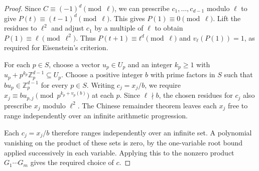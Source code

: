 \documentclass{article}
\theoremstyle{remark}
\begin{document}
\begin{proof}
    Since $C \equiv (-1)^d \pmod{\ell}$, we can prescribe $c_1, \ldots, c_{d - 1}$ modulo $\ell$ to give $P(t) \equiv (t - 1)^d \pmod{\ell}$.
    This gives $P(1) \equiv 0 \pmod{\ell}$.
    Lift the residues to $\ell^2$ and adjust $c_1$ by a multiple of $\ell$ to obtain $P(1) \equiv \ell \pmod{\ell^2}$.
    Thus $P(t + 1) \equiv t^d \pmod{\ell}$ and $v_\ell(P(1)) = 1$, as required for Eisenstein's criterion.

    For each $p \in S$, choose a vector $u_p \in U_p$ and an integer $k_p \ge 1$ with $u_p + p^{k_p}\mathbb{Z}_p^{d - 1} \subseteq U_p$.
    Choose a positive integer $b$ with prime factors in $S$ such that $b u_p \in \mathbb{Z}_p^{d - 1}$ for every $p \in S$.
    Writing $c_j = x_j/b$, we require $x_j \equiv b u_{p, j} \pmod{p^{k_p + v_p(b)}}$ at each $p$.
    Since $\ell \nmid b$, the chosen residues for $c_j$ also prescribe $x_j$ modulo $\ell^2$.
    The Chinese remainder theorem leaves each $x_j$ free to range independently over an infinite arithmetic progression.

    Each $c_j = x_j/b$ therefore ranges independently over an infinite set.
    A polynomial vanishing on the product of these sets is zero, by the one-variable root bound applied successively in each variable.
    Applying this to the nonzero product $G_1 \cdots G_m$ gives the required choice of $c$.
\end{proof}
\end{document}
